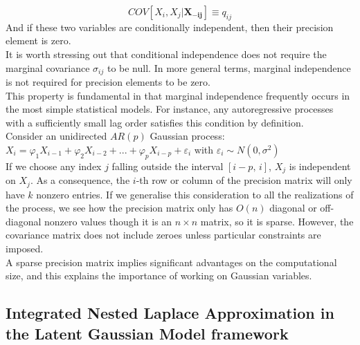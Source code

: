 \documentclass{book}
\begin{document}
\begin{equation}
	COV[X_i, X_j | \mathbf{X_{-ij}}] \equiv q_{ij} 
\end{equation}
And if these two variables are conditionally independent, then their precision element is zero.\\
It is worth stressing out that conditional independence does not require the marginal covariance $\sigma_{ij}$ to be null. In more general terms, marginal independence is not required for precision elements to be zero.\\
This property is fundamental in that marginal independence frequently occurs in the most simple statistical models. For instance, any autoregressive processes with a sufficiently small lag order satisfies this condition by definition.\\ Consider an unidirected $AR(p)$ Gaussian process: $X_i = \varphi_1 X_{i-1} + \varphi_2 X_{i-2} + ... + \varphi_p X_{i-p} + \varepsilon_i$ with $\varepsilon_i \sim N(0,\sigma^2)$\\ If we choose any index $j$ falling outside the interval $[i-p, \, i]$, $X_j$ is independent on $X_j$. As a consequence, the $i$-th row or column of the precision matrix will only have $k$ nonzero entries.
If we generalise this consideration to all the realizations of the process, we see how the precision matrix only has $O(n)$ diagonal or off-diagonal nonzero values though it is an $n \times n$ matrix, so it is sparse. However, the covariance matrix does not include zeroes unless particular constraints are imposed.\\
A sparse precision matrix implies significant advantages on the computational size, and this explains the importance of working on Gaussian variables.
 


\subsection{Integrated Nested Laplace Approximation in the Latent Gaussian Model framework}
\end{document}
